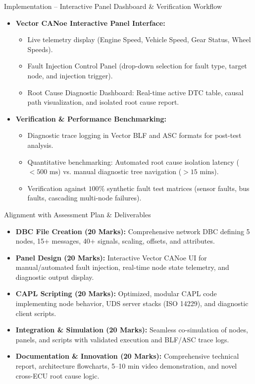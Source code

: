 \documentclass[aspectratio=169, 10pt]{beamer}
\begin{document}
\begin{frame}{Implementation -- Interactive Panel Dashboard \& Verification Workflow}
  \begin{itemize}
    \item \textbf{Vector CANoe Interactive Panel Interface:}
    \begin{itemize}
      \item Live telemetry display (Engine Speed, Vehicle Speed, Gear Status, Wheel Speeds).
      \item Fault Injection Control Panel (drop-down selection for fault type, target node, and injection trigger).
      \item Root Cause Diagnostic Dashboard: Real-time active DTC table, causal path visualization, and isolated root cause report.
    \end{itemize}
    \item \textbf{Verification \& Performance Benchmarking:}
    \begin{itemize}
      \item Diagnostic trace logging in Vector BLF and ASC formats for post-test analysis.
      \item Quantitative benchmarking: Automated root cause isolation latency ($<500\text{ ms}$) vs. manual diagnostic tree navigation ($>15\text{ mins}$).
      \item Verification against $100\%$ synthetic fault test matrices (sensor faults, bus faults, cascading multi-node failures).
    \end{itemize}
  \end{itemize}
\end{frame}

\begin{frame}{Alignment with Assessment Plan \& Deliverables}
  \begin{itemize}
    \item \textbf{DBC File Creation (20 Marks):} Comprehensive network DBC defining 5 nodes, 15+ messages, 40+ signals, scaling, offsets, and attributes.
    \item \textbf{Panel Design (20 Marks):} Interactive Vector CANoe UI for manual/automated fault injection, real-time node state telemetry, and diagnostic output display.
    \item \textbf{CAPL Scripting (20 Marks):} Optimized, modular CAPL code implementing node behavior, UDS server stacks (ISO 14229), and diagnostic client scripts.
    \item \textbf{Integration \& Simulation (20 Marks):} Seamless co-simulation of nodes, panels, and scripts with validated execution and BLF/ASC trace logs.
    \item \textbf{Documentation \& Innovation (20 Marks):} Comprehensive technical report, architecture flowcharts, 5--10 min video demonstration, and novel cross-ECU root cause logic.
  \end{itemize}
\end{frame}
\end{document}
